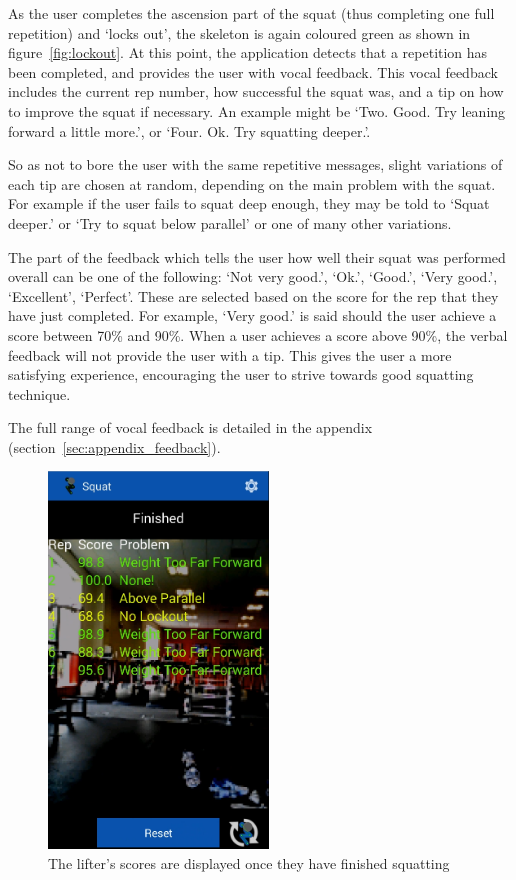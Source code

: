As the user completes the ascension part of the squat (thus completing one full repetition) and `locks out', the skeleton is again coloured green as shown in figure~\ref{fig:lockout}. At this point, the application detects that a repetition has been completed, and provides the user with vocal feedback. This vocal feedback includes the current rep number, how successful the squat was, and a tip on how to improve the squat if necessary. An example might be `Two. Good. Try leaning forward a little more.', or `Four. Ok. Try squatting deeper.'.

So as not to bore the user with the same repetitive messages, slight variations of each tip are chosen at random, depending on the main problem with the squat. For example if the user fails to squat deep enough, they may be told to `Squat deeper.' or `Try to squat below parallel' or one of many other variations.

The part of the feedback which tells the user how well their squat was performed overall can be one of the following: `Not very good.', `Ok.', `Good.', `Very good.', `Excellent', `Perfect'. These are selected based on the score for the rep that they have just completed. For example, `Very good.' is said should the user achieve a score between 70\% and 90\%. When a user achieves a score above 90\%, the verbal feedback will not provide the user with a tip. This gives the user a more satisfying experience, encouraging the user to strive towards good squatting technique.

The full range of vocal feedback is detailed in the appendix (section~\ref{sec:appendix_feedback}).

\begin{figure}[H]
    \centering
	\includegraphics[height=10cm]{application/images/scores}
\caption{The lifter's scores are displayed once they have finished squatting}
\label{fig:scores}
\end{figure}

